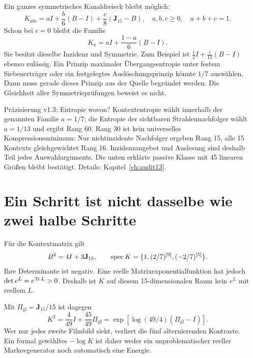 Ein ganzes symmetrisches Kanaldreieck bleibt möglich:
\begin{equation}
K_{abc}=aI+\frac b6(B-I)+\frac c8(\mathbf J_{15}-B),
\quad a,b,c\ge0,\quad a+b+c=1.
\end{equation}
Schon bei $c=0$ bleibt die Familie
\begin{equation}
K_a=aI+\frac{1-a}{6}(B-I).
\end{equation}
Sie besitzt dieselbe Inzidenz und Symmetrie. Zum Beispiel ist $\frac12I+\frac1{12}(B-I)$ ebenso zulässig. Ein Prinzip maximaler Übergangsentropie unter festem Siebenerträger oder ein festgelegtes Auslöschungsprinzip könnte $1/7$ auswählen. Dann muss gerade dieses Prinzip aus der Quelle begründet werden. Die Gleichheit aller Symmetrieprüfungen beweist es nicht. 

\begin{grenze}{Präzisierung v1.3: Entropie wovon?}
Kontextentropie wählt innerhalb der genannten Familie $a=1/7$; die Entropie der sichtbaren Strahlennachfolger wählt $a=1/13$ und ergibt Rang 60. Rang 30 ist kein universelles Kompressionsminimum: Nur nichtinzidente Nachfolger ergeben Rang 15, alle 15 Kontexte gleichgewichtet Rang 16. Inzidenzangebot und Auslesung sind deshalb Teil jedes Auswahlarguments. Die unten erklärte passive Klasse mit 45 linearen Größen bleibt bestätigt. Details: Kapitel~\ref{ch:audit13}.
\end{grenze}
\section{Ein Schritt ist nicht dasselbe wie zwei halbe Schritte}
Für die Kontextmatrix gilt
\begin{equation}
B^2=4I+3\mathbf J_{15},\qquad
\operatorname{spec} K=\{1,(2/7)^{[9]},(-2/7)^{[5]}\}.
\end{equation}
Ihre Determinante ist negativ. Eine reelle Matrixexponentialfunktion hat jedoch $\det e^L=e^{\operatorname{Tr} L}>0$. Deshalb ist $K$ auf diesem 15-dimensionalen Raum kein $e^L$ mit reellem $L$.

Mit $\Pi_{\mathrm{gl}}=\mathbf J_{15}/15$ ist dagegen
\begin{equation}
K^2=\frac4{49}I+\frac{45}{49}\Pi_{\mathrm{gl}}
=\exp\!\left[\log(49/4)(\Pi_{\mathrm{gl}}-I)\right].
\end{equation}
Wer nur jedes zweite Filmbild sieht, verliert die fünf alternierenden Kontraste. Ein formal gewähltes $-\log K$ ist daher weder ein unproblematischer reeller Markovgenerator noch automatisch eine Energie.

